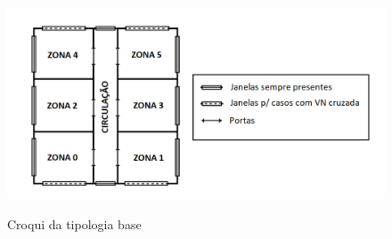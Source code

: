 \documentclass[brazil,hardcopy,openany,a4paper]{ufscthesis}
\begin{document}
		
		\begin{figure}[h]
			\centering
			\caption{Croqui da tipologia base}
			\includegraphics[width=1\linewidth]{img/croqui_07-11.png}
			\label{fig:croqui}
		\end{figure}


	
\end{document}
